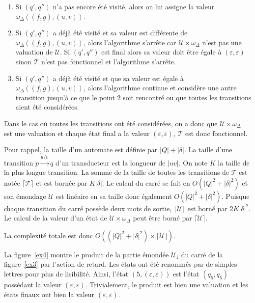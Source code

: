 	\begin{enumerate}
		\item Si $(q',q'')$ n'a pas encore été visité, alors on lui assigne la valeur $\omega_\Delta((f,g),(u,v))$.
		\item Si $(q',q'')$ a déjà été visité et sa valeur est différente de $\omega_\Delta((f,g),(u,v))$, alors l'algorithme s'arrête car $\mathscr{U} \times \omega_\Delta$ n'est pas une valuation de $\mathscr{U}$. Si $(q',q'')$ est final alors sa valeur doit être égale à $(\varepsilon,\varepsilon)$ sinon $\mathscr{T}$ n'est pas fonctionnel et l'algorithme s'arrête.
		\item Si $(q',q'')$ a déjà été visité et que sa valeur est égale à $\omega_\Delta((f,g),(u,v))$, alors l'algorithme continue et considère une autre transition jusqu'à ce que le point 2 soit rencontré ou que toutes les transitions aient été considérées.
	\end{enumerate}
	
	Dans  le cas où toutes les transitions ont été considérées, on a donc que $\mathscr{U} \times \omega_\Delta$ est une valuation et chaque état final a la valeur $(\varepsilon,\varepsilon)$, $\mathscr{T}$ est donc fonctionnel.
	
	Pour rappel, la taille d'un automate est définie par $|Q| + |\delta|$. La taille d'une transition $p \xrightarrow{u/v}q$ d'un transducteur est la longueur de $|uv|$. On note $K$ la taille de la plus longue transition. La somme de la taille de toutes les transitions de $\mathscr{T}$ est notée $\lceil \mathscr{T} \rceil$ et est bornée par $K|\delta|$. Le calcul du carré se fait en $O(|Q|^2 + |\delta|^2)$ et son émondage $\mathscr{U}$ est linéaire en sa taille donc également $O(|Q|^2 + |\delta|^2)$. Puisque chaque transition du carré possède deux mots de sortie, $\lceil \mathscr{U} \rceil$ est borné par $2K|\delta|^2$. Le calcul de la valeur d'un état de $\mathscr{U} \times \omega_\Delta$ peut être borné par $\lceil \mathscr{U} \rceil$.
	
	La complexité totale est donc $O((|Q|^2 + |\delta|^2) \times \lceil \mathscr{U} \rceil)$.
	
	La figure~\ref{ex4} montre le produit de la partie émondée $\mathscr{U}_1$ du carré de la figure~\ref{ex3} par l'action de retard. Les états ont été renommés par de simples lettres pour plus de lisibilité. Ainsi, l'état $(5, (\varepsilon,\varepsilon))$ est l'état $(q_5,q_5)$ possédant la valeur $(\varepsilon,\varepsilon)$. Trivialement, le produit est bien une valuation et les états finaux ont bien la valeur $(\varepsilon,\varepsilon)$.
	
